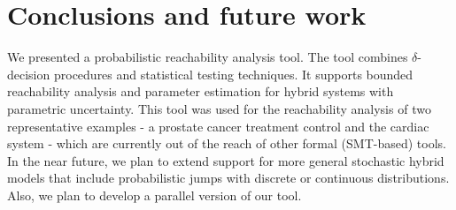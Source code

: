 \section{Conclusions and future work}
We presented a probabilistic reachability analysis tool. The tool combines $\delta$-decision 
procedures \cite{gao2013dreal, gao2013satisfiability, gaodelta} and statistical testing techniques. 
It supports bounded reachability analysis and parameter estimation for hybrid systems with parametric 
uncertainty. This tool was used for the reachability analysis of two representative examples - a prostate 
cancer treatment control and the cardiac system - which are currently out of the reach of other formal
(SMT-based) tools. In the near future, we plan to extend support for more general stochastic hybrid models 
that include probabilistic jumps with discrete or continuous distributions. Also, we plan to develop
a parallel version of our tool.

